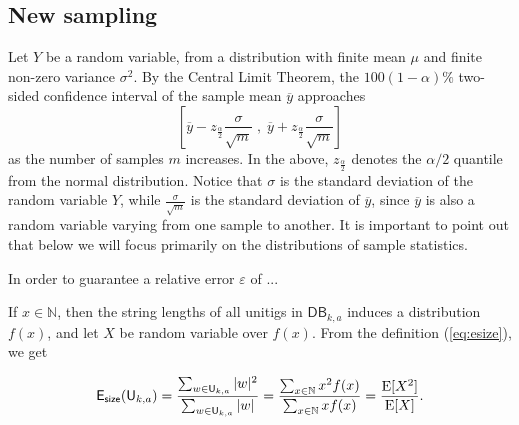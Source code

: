 \documentclass[a4paper,11pt]{article}
\newcommand{\alex}[1]{{\color{blue}{#1}}}
\newcommand{\DB}{\mathsf{DB}_{k,a}}
\newcommand{\U}{\mathsf{U}_{k,a}}
\newcommand{\esize}{{\sf E_{size}}}
\newcommand{\E}{\text{E}}
\begin{document}








\subsection{New sampling}

Let $Y$ be a random variable, from a distribution with finite mean $\mu$ and finite non-zero variance $\sigma^2$. By the Central Limit Theorem, the $100(1-\alpha)\%$ two-sided confidence interval of the sample mean $\overline{y}$ approaches 
\[\left[\overline{y} - z_{\frac{\alpha}{2}}\frac{\sigma}{\sqrt{m}} \;, \; \overline{y} + z_{\frac{\alpha}{2}}\frac{\sigma}{\sqrt{m}}\right] \]
as the number of samples $m$ increases. In the above, $z_{\frac{\alpha}{2}}$ denotes the $\alpha/2$ quantile from the normal distribution. Notice that $\sigma$ is the standard deviation of the random variable $Y$, while $\frac{\sigma}{\sqrt{m}}$ is the standard deviation of $\overline{y}$, since $\overline{y}$ is also a random variable varying from one sample to another. It is important to point out that below we will focus primarily on the distributions of sample statistics.

In order to guarantee a relative error $\varepsilon$ of ...

If $x \in \mathbb{N}$, then the string lengths of all unitigs in $\DB$ induces a distribution $f(x)$, and let $X$ be random variable over $f(x)$. From the definition (\ref{eq:esize}), we get

\[\esize(\U) = \frac{\sum_{w \in \U}|w|^2}{\sum_{w \in \U}|w|} = \frac{\sum_{x \in \mathbb{N}} x^2 f(x)}{\sum_{x \in \mathbb{N}} xf(x)} =  \frac{\E[X^2]}{\E[X]}.\]
\end{document}
